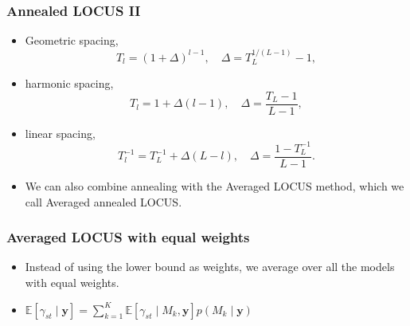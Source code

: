 \documentclass{beamer}
\newcommand*\mean[1]{\bar{#1}}
\begin{document}
\begin{frame}
\frametitle{Annealed LOCUS II}
\begin{itemize}
\item Geometric spacing,
\begin{equation*}
T_l = (1 + \Delta)^{l-1},\quad \Delta = T_L^{1/(L-1)}-1,
\end{equation*}
\item harmonic spacing,
\begin{equation*}
T_l = 1 + \Delta(l-1), \quad \Delta =\frac{T_L-1}{L-1},
\end{equation*}
\item linear spacing,
\begin{equation*}
T_l^{-1} = T_L^{-1} + \Delta (L-l), \quad \Delta = \frac{1-T_L^{-1}}{L-1}.
\end{equation*}

\item We can also combine annealing with the Averaged LOCUS method, which we call Averaged annealed LOCUS.
\end{itemize}
\end{frame}

\begin{frame}
\frametitle{Averaged LOCUS with equal weights}
\begin{itemize}
\item Instead of using the lower bound as weights, we average over all the models with equal weights.
\item $\mathbb{E}\left[\gamma_{st}\mid \boldsymbol{y}\right]= \sum_{k=1}^K \mathbb{E}\left[\gamma_{st}\mid M_k,\boldsymbol{y}\right]p(M_k\mid\boldsymbol{y})$
\end{itemize}
\end{frame}

\end{document}

